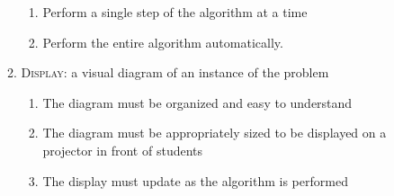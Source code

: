 \begin{enumerate}
\begin{enumerate}
		\begin{enumerate}
			\item Perform a single step of the algorithm at a time
			\item Perform the entire algorithm automatically.
		\end{enumerate}
		\item \textsc{Display}: a visual diagram of an instance of the problem
		\begin{enumerate}
			\item The diagram must be organized and easy to understand
			\item The diagram must be appropriately sized to be displayed
				on a projector in front of students
			\item The display must update as the algorithm is performed
		\end{enumerate}
	\end{enumerate}
\end{enumerate}
